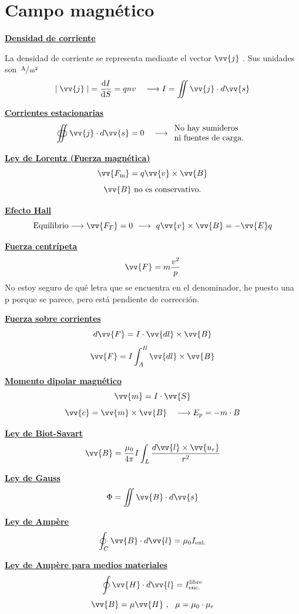 \documentclass[a4paper]{book}
\numberwithin{figure}{chapter}
\numberwithin{equation}{chapter}
\newcommand{\formula}[1]{\vspace{13 pt}\noindent \textbf{\underline{#1}}}
\newcommand{\subtext}[1]{_{\text{#1}}}
\newcommand{\A}{\operatorname{A}}
\newcommand{\m}{\operatorname{m}}
\renewcommand{\vec}[1]{\vv{{#1}}}
\begin{document}
\newpage
\section{Campo magnético}
\begin{fleqn}
	\begin{multicols}{2}
		\formula{Densidad de corriente}

		\noindent La densidad de corriente se representa mediante el vector $\vec{j} \ $. Sus unidades son $\sfrac{\A}{\m ^2}$
		\[\abs{\; \vec{j}\; } = \dv{I}{S} = qnv \quad \longrightarrow I = \iint{\vec{j}\cdot d \vec{s}}\]

		\formula{Corrientes estacionarias}
		\[\oiint{\vec{j}\cdot d\vec{s}}=0 \quad \longrightarrow \begin{array}{l}
				\text{No hay sumideros} \\
				\text{ni fuentes de carga.}
			\end{array}\]

		\formula{Ley de Lorentz (Fuerza magnética)}
		\[\vec{F\subtext{m}}=q \vec{v} \times \vec{B}\]
		\[\vec{B} \text{ no es conservativo.}\]

		\formula{Efecto Hall}
		\[\text{Equilibrio}\longrightarrow \vec{F_T}=0 \ \longrightarrow \ q \vec{v} \times \vec{B} = - \vec{E} q \]

		\formula{Fuerza centrípeta}
		\[\vec{F}=m\frac{v^2}{p}\]
		No estoy seguro de qué letra que se encuentra en el denominador, he puesto una p porque se parece, pero está pendiente de corrección.

		\formula{Fuerza sobre corrientes}
		\[d\vec{F}=I\cdot \vec{dl}\times \vec{B}\]
		\[\vec{F}=I\int_A^B{\vec{dl}\times\vec{B}}\]
		\columnbreak

		\formula{Momento dipolar magnético}
		\[\vec{m}=I\cdot \vec{S}\]
		\[\vec{c}=\vec{m}\times \vec{B} \quad \longrightarrow E_p =-m\cdot B\]

		\formula{Ley de Biot-Savart}
		\[\vec{B}=\frac{\mu _0}{4\pi} I \int_L{\frac{d\vec{l}\times\vec{u_r}}{r^2}} \]

		\formula{Ley de Gauss}
		\[\Phi = \iint{\vec{B}\cdot d\vec{s}}\]

		\formula{Ley de Ampère}
		\[\oint_C{\vec{B}\cdot d\vec{l}}=\mu _0 I\subtext{enl.}\]

		\formula{Ley de Ampère para medios materiales}
		\[\oint{\vec{H}\cdot d\vec{l}}= I^{\text{libre}}\subtext{enc.} \]\[ \vec{B}=\mu \vec{H} \ , \ \ \mu = \mu _0 \cdot \mu _r\]


	\end{multicols}
\end{fleqn}
\end{document}
